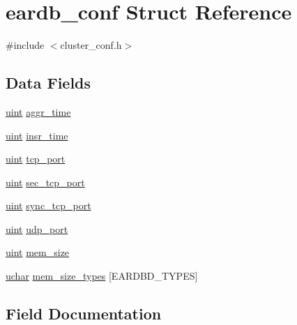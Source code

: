 \hypertarget{structeardb__conf}{}\section{eardb\+\_\+conf Struct Reference}
\label{structeardb__conf}


{\ttfamily \#include $<$cluster\+\_\+conf.\+h$>$}

\subsection*{Data Fields}
\begin{DoxyCompactItemize}
\item 
\hyperlink{generic_8h_a91ad9478d81a7aaf2593e8d9c3d06a14}{uint} \hyperlink{structeardb__conf_aa80651833b6a2594f3c767798b36a899}{aggr\+\_\+time}
\item 
\hyperlink{generic_8h_a91ad9478d81a7aaf2593e8d9c3d06a14}{uint} \hyperlink{structeardb__conf_abd34c6007df2cae4da6bdfa64de7275c}{insr\+\_\+time}
\item 
\hyperlink{generic_8h_a91ad9478d81a7aaf2593e8d9c3d06a14}{uint} \hyperlink{structeardb__conf_af4823cf78232f931cc656abcaa419422}{tcp\+\_\+port}
\item 
\hyperlink{generic_8h_a91ad9478d81a7aaf2593e8d9c3d06a14}{uint} \hyperlink{structeardb__conf_af6eb406a5d19cda103fe4b86cd80c330}{sec\+\_\+tcp\+\_\+port}
\item 
\hyperlink{generic_8h_a91ad9478d81a7aaf2593e8d9c3d06a14}{uint} \hyperlink{structeardb__conf_a0095734eaf046566c32410266470faa2}{sync\+\_\+tcp\+\_\+port}
\item 
\hyperlink{generic_8h_a91ad9478d81a7aaf2593e8d9c3d06a14}{uint} \hyperlink{structeardb__conf_ae436b735136399150cf5af7cdddd4bd4}{udp\+\_\+port}
\item 
\hyperlink{generic_8h_a91ad9478d81a7aaf2593e8d9c3d06a14}{uint} \hyperlink{structeardb__conf_a048bac7d19616d2c3e60325f18c12afa}{mem\+\_\+size}
\item 
\hyperlink{generic_8h_a65f85814a8290f9797005d3b28e7e5fc}{uchar} \hyperlink{structeardb__conf_ad0f1527436b5423d7613523da722aeaf}{mem\+\_\+size\+\_\+types} \mbox{[}E\+A\+R\+D\+B\+D\+\_\+\+T\+Y\+P\+ES\mbox{]}
\end{DoxyCompactItemize}


\subsection{Field Documentation}
